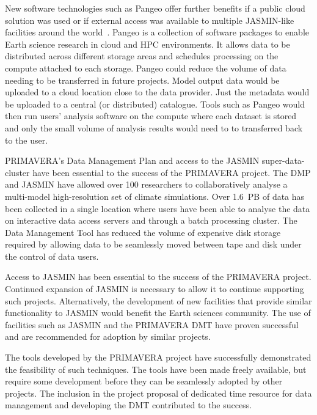 \documentclass[gmd, manuscript]{copernicus}
\begin{document}
New software technologies such as Pangeo offer further benefits if a public cloud solution was used or if external access was available to multiple JASMIN-like facilities around the world~\citep{Pangeo}. Pangeo is a collection of software packages to enable Earth science research in cloud and HPC environments. It allows data to be distributed across different storage areas and schedules processing on the compute attached to each storage. Pangeo could reduce the volume of data needing to be transferred in future projects. Model output data would be uploaded to a cloud location close to the data provider. Just the metadata would be uploaded to a central (or distributed) catalogue. Tools such as Pangeo would then run users' analysis software on the compute where each dataset is stored and only the small volume of analysis results would need to to transferred back to the user.

\conclusions  %

PRIMAVERA's Data Management Plan and access to the JASMIN super-data-cluster have been essential to the success of the PRIMAVERA project. The DMP and JASMIN have allowed over 100 researchers to collaboratively analyse a multi-model high-resolution set of climate simulations. Over 1.6~PB of data has been collected in a single location where users have been able to analyse the data on interactive data access servers and through a batch processing cluster. The Data Management Tool has reduced the volume of expensive disk storage required by allowing data to be seamlessly moved between tape and disk under the control of data users.

Access to JASMIN has been essential to the success of the PRIMAVERA project. Continued expansion of JASMIN is necessary to allow it to continue supporting such projects. Alternatively, the development of new facilities that provide similar functionality to JASMIN would benefit the Earth sciences community. The use of facilities such as JASMIN and the PRIMAVERA DMT have proven successful and are recommended for adoption by similar projects.

The tools developed by the PRIMAVERA project have successfully demonstrated the feasibility of such techniques. The tools have been made freely available, but require some development before they can be seamlessly adopted by other projects. The inclusion in the project proposal of dedicated time resource for data management and developing the DMT contributed to the success.
\end{document}

